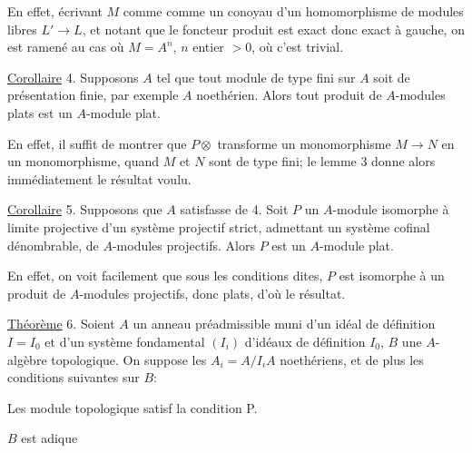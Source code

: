 En effet, écrivant $M$ comme comme un conoyau d'un homomorphisme
de modules libres  $L'\longrightarrow L$, et notant que le foncteur produit est exact
donc exact à gauche, on est ramené au cas où $M=A^n$, $n$ entier $>0$, où
c'est trivial.

\uline{Corollaire} 4. Supposons $A$ tel que tout module de type fini sur $A$ soit
de présentation finie, par exemple $A$ noethérien. Alors tout produit de
$A$-modules plats est un $A$-module plat.

En effet, il suffit de montrer que $P\otimes$ transforme un monomorphisme
$M\longrightarrow N$ en un monomorphisme, quand $M$ et $N$ sont de type fini; le lemme 3 donne
alors immédiatement le résultat voulu.

\uline{Corollaire} 5. Supposons que $A$ satisfasse 
 de 4.  Soit
$P$ un $A$-module  isomorphe à  limite projective
d'un système projectif strict, 
admettant un système cofinal dénombrable, de $A$-modules projectifs. Alors
$P$ est un $A$-module plat.

En effet, on voit facilement que sous les conditions dites, $P$ est
isomorphe à un produit de $A$-modules projectifs, donc plats, d'où le résultat.



\uline{Théorème} 6. Soient $A$ un anneau préadmissible muni d'un idéal de
définition $I=I_0$ et d'un système fondamental $(I_i)$ d'idéaux de définition
$I_0$, $B$ une $A$-algèbre topologique. On suppose les $A_i=A/I_iA$ noethériens,
et de plus les conditions suivantes sur $B$:


 Les module topologique
 
 satisf la condition P.


 $B$ est adique 

